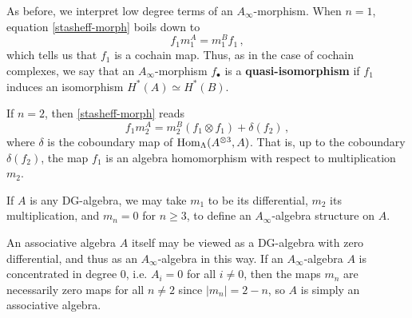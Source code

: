 	As before, we interpret low degree terms of an $A_{\infty}$-morphism.
	When $n=1$, equation \eqref{stasheff-morph} boils down to
	\begin{equation*}
		f_{1}m_{1}^{A} = m_{1}^{B}f_{1}\,,
	\end{equation*}
	which tells us that $f_{1}$ is a cochain map.
	Thus, as in the case of cochain complexes, we say that an $A_{\infty}$-morphism $f_{\bullet}$
	is a \textbf{quasi-isomorphism} if $f_{1}$ induces an isomorphism $H^{*}(A) \simeq H^{*}(B)$.
	
	If $n=2$, then \eqref{stasheff-morph} reads
	\begin{equation*}
		f_{1}m_{2}^{A} = m_{2}^{B}(f_{1} \otimes f_{1}) + \delta(f_{2})\,,
	\end{equation*}
	where $\delta$ is the coboundary map of $\operatorname{Hom}_{\Lambda}(A^{\otimes 3},A)$.
	That is, up to the coboundary $\delta(f_{2})$, the map $f_{1}$ 
	is an algebra homomorphism with respect to multiplication $m_{2}$.
	
	
	
	\begin{ex}
		If $A$ is any DG-algebra, we may take $m_{1}$ to be its differential, 
		$m_{2}$ its multiplication, and $m_{n} = 0$ for $n \ge 3$, 
		to define an $A_{\infty}$-algebra structure on $A$.
	\end{ex}
	
	\begin{ex}
		An associative algebra $A$ itself may be viewed as a DG-algebra with zero differential, 
		and thus as an $A_{\infty}$-algebra in this way. 
		If an $A_{\infty}$-algebra $A$ is concentrated in degree $0$, 
		i.e. $A_{i} = 0$ for all $i \ne 0$, 
		then the maps $m_{n}$ are necessarily zero maps for all $n  \ne 2$ 
		since $|m_{n}| = 2-n$, so $A$ is simply an associative algebra.
	\end{ex}
	
